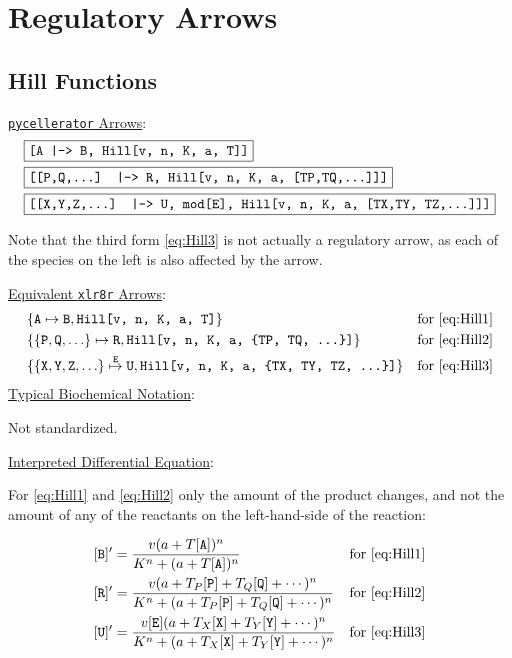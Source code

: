 \section{Regulatory Arrows}
\subsection{Hill Functions}
\label{section:Hill}
\underline{{\tt pycellerator} Arrows}:
\begin{align}
&\boxed{\text {\tt [A |-> B, Hill[v, n, K, a, T]]}}\label{eq:Hill1}\\
&\boxed{\text {\tt [[P,Q,...] |-> R, Hill[v, n, K, a, [TP,TQ,...]]]}}\label{eq:Hill2}\\
&\boxed{\text {\tt [[X,Y,Z,...] |--> U, mod[E], Hill[v, n, K, a, [TX,TY, TZ,...]]]}}\label{eq:Hill3}
\end{align}

Note that the third form \eqref{eq:Hill3} is not actually a regulatory arrow, as each of the species on the left is also affected by the arrow. 

\underline{Equivalent {\tt xlr8r} Arrows}: 
\begin{align*}
& \{{\tt A} \mapsto {\tt B}, \text{\tt Hill[v, n, K, a, T]}\} & \text{for \ref{eq:Hill1}}\\
& \{\{{\tt P, Q, \dots}\} \mapsto {\tt R}, \text{\tt Hill[v, n, K, a, \{TP, TQ, \dots\}]}\} & \text{for \ref{eq:Hill2}}\\
& \{\{{\tt X, Y, Z, \dots }\} \overset{\tt E}{\mapsto} {\tt U}, \text{\tt Hill[v, n, K, a, \{TX, TY, TZ, \dots\}]}\} & \text{for \ref{eq:Hill3}}\\
\end{align*}
\underline{Typical Biochemical Notation}: 

Not standardized.

\underline{Interpreted Differential Equation}:

For \eqref{eq:Hill1} and \eqref{eq:Hill2} only the amount of the product changes, and not the amount of any of the reactants on the left-hand-side of the reaction:

\begin{align}
&{\tt [B]'}= \dfrac{v  ( a + T {\tt [A]} )^n}{K^n + (a+T{\tt [A]})^n} & \text{for \ref{eq:Hill1}}\\
&{\tt [R]'}= \dfrac{v  (a + T_P{\tt [P]} + T_Q{\tt [Q]} + \cdots)^n}{K^n + (a + T_P{\tt [P]} + T_Q{\tt [Q]} + \cdots)^n} & \text{for \ref{eq:Hill2}}\\
&{\tt [U]'}= \dfrac{v {\tt [E]} ( a + T_X{\tt [X]} + T_Y{\tt [Y]}+ \cdots )^n}{K^n + (a + T_X{\tt [X]} + T_Y{\tt [Y]} + \cdots)^n} & \text{for \ref{eq:Hill3}}
\end{align}

